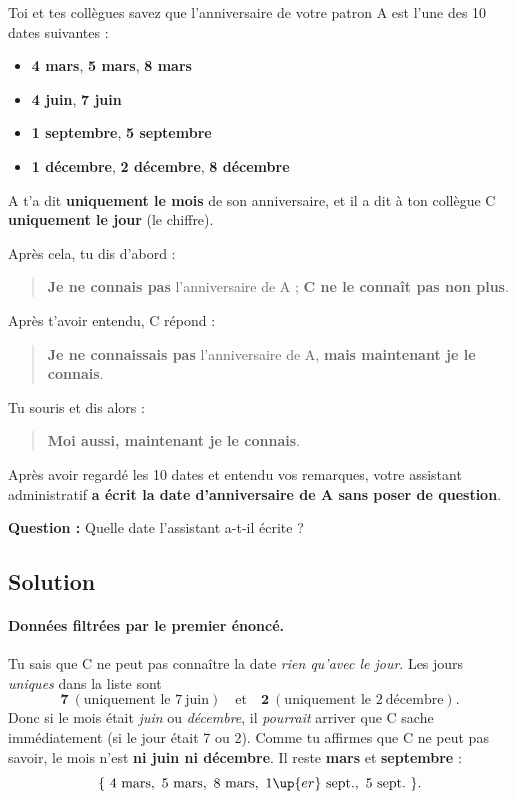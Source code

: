 \begin{exerciseBox}
Toi et tes collègues savez que l’anniversaire de votre patron A est l’une des 10 dates suivantes :
\begin{itemize}
  \item \textbf{4 mars}, \textbf{5 mars}, \textbf{8 mars}
  \item \textbf{4 juin}, \textbf{7 juin}
  \item \textbf{1 septembre}, \textbf{5 septembre}
  \item \textbf{1 décembre}, \textbf{2 décembre}, \textbf{8 décembre}
\end{itemize}
A t’a dit \textbf{uniquement le mois} de son anniversaire, et il a dit à ton collègue C \textbf{uniquement le jour} (le chiffre).

Après cela, tu dis d’abord :
\begin{quote}
\og \textbf{Je ne connais pas} l’anniversaire de A ; \textbf{C ne le connaît pas non plus}. \fg
\end{quote}

Après t’avoir entendu, C répond :
\begin{quote}
\og \textbf{Je ne connaissais pas} l’anniversaire de A, \textbf{mais maintenant je le connais}. \fg
\end{quote}

Tu souris et dis alors :
\begin{quote}
\og \textbf{Moi aussi, maintenant je le connais}. \fg
\end{quote}

Après avoir regardé les 10 dates et entendu vos remarques, votre assistant administratif \textbf{a écrit la date d’anniversaire de A sans poser de question}.

\textbf{Question :} Quelle date l’assistant a-t-il écrite ?
\end{exerciseBox}

\subsection*{Solution}

\paragraph{Données filtrées par le premier énoncé.}
Tu sais que C ne peut pas connaître la date \emph{rien qu’avec le jour}. Les jours \emph{uniques} dans la liste sont
\[
\textbf{7} \ (\text{uniquement le } 7~\text{juin}) \quad \text{et} \quad \textbf{2} \ (\text{uniquement le } 2~\text{décembre}).
\]
Donc si le mois était \emph{juin} ou \emph{décembre}, il \emph{pourrait} arriver que C sache immédiatement (si le jour était 7 ou 2).
Comme tu affirmes que C ne peut pas savoir, le mois n’est \textbf{ni juin ni décembre}.
Il reste \textbf{mars} et \textbf{septembre} :
\[
\{\ 4~\text{mars},~5~\text{mars},~8~\text{mars},~1\up{er}~\text{sept.},~5~\text{sept.}\ \}.
\]

